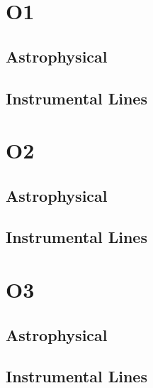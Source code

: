 \section{O1}

\subsection{Astrophysical}

\subsection{Instrumental Lines}

\section{O2}

\subsection{Astrophysical}

\subsection{Instrumental Lines}

\section{O3}

\subsection{Astrophysical}

\subsection{Instrumental Lines}
